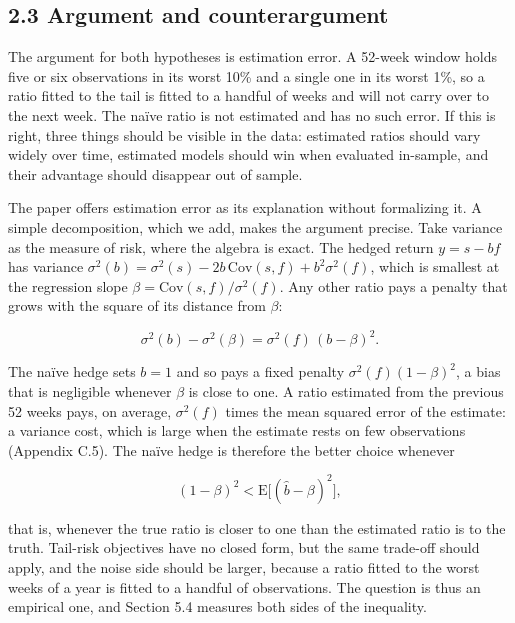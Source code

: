 \documentclass[11pt,letterpaper]{article}
\begin{document}
\subsection*{2.3 Argument and counterargument}

The argument for both hypotheses is estimation error. A 52-week window holds five or six observations in its worst 10\% and a single one in its worst 1\%, so a ratio fitted to the tail is fitted to a handful of weeks and will not carry over to the next week. The naïve ratio is not estimated and has no such error. If this is right, three things should be visible in the data: estimated ratios should vary widely over time, estimated models should win when evaluated in-sample, and their advantage should disappear out of sample.

The paper offers estimation error as its explanation without formalizing it. A simple decomposition, which we add, makes the argument precise. Take variance as the measure of risk, where the algebra is exact. The hedged return $y = s - b f$ has variance $\sigma^2(b) = \sigma^2(s) - 2b\,\mathrm{Cov}(s,f) + b^2\sigma^2(f)$, which is smallest at the regression slope $\beta = \mathrm{Cov}(s,f)/\sigma^2(f)$. Any other ratio pays a penalty that grows with the square of its distance from $\beta$:

\begin{equation}
\sigma^2(b) - \sigma^2(\beta) = \sigma^2(f)\,(b-\beta)^2 .
\end{equation}

The naïve hedge sets $b = 1$ and so pays a fixed penalty $\sigma^2(f)(1-\beta)^2$, a bias that is negligible whenever $\beta$ is close to one. A ratio estimated from the previous 52 weeks pays, on average, $\sigma^2(f)$ times the mean squared error of the estimate: a variance cost, which is large when the estimate rests on few observations (Appendix C.5). The naïve hedge is therefore the better choice whenever

\begin{equation}
(1-\beta)^2 < \mathrm{E}\big[(\hat b-\beta)^2\big],
\end{equation}

that is, whenever the true ratio is closer to one than the estimated ratio is to the truth. Tail-risk objectives have no closed form, but the same trade-off should apply, and the noise side should be larger, because a ratio fitted to the worst weeks of a year is fitted to a handful of observations. The question is thus an empirical one, and Section 5.4 measures both sides of the inequality.
\end{document}
